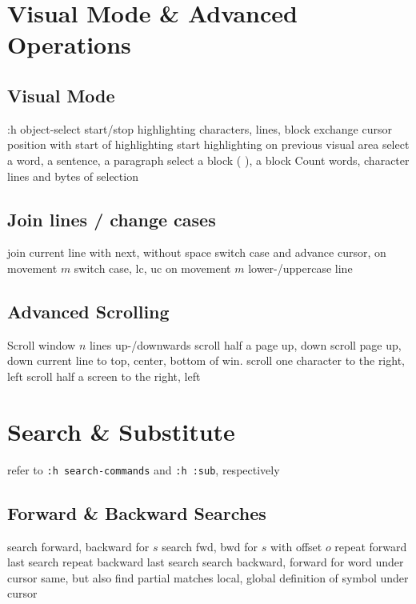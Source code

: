 \section{Visual Mode \& Advanced Operations}{}
\subsection{Visual Mode}	{:h object-select}
	{start/stop highlighting characters, lines, block}
	{exchange cursor position with start of highlighting}
	{start highlighting on previous visual area}
	{select a word, a sentence, a paragraph}
	{select a block ( ), a block {\tt\lapos}	{\tt\rapos}}
	{Count words, character lines and bytes of selection}

\subsection{Join lines / change cases}{}
	{join current line with next, without space}
	{switch case and advance cursor, on movement $m$ }
	{switch case, lc, uc on movement $m$}
	{lower-/uppercase line}

\subsection{Advanced Scrolling}	{}
	{Scroll window $n$ lines up-/downwards}
	{scroll half a page up, down}
	{scroll page up, down}
	{current line to top, center, bottom of win.}
	{scroll one character to the right, left}
	{scroll half a screen to the right, left}

\section{Search \& Substitute}	{refer to {\tt :h search-commands} and {\tt :h :sub}, respectively}
\subsection{Forward \& Backward Searches}	{}
	{search forward, backward for $s$}
	{search fwd, bwd for $s$ with offset $o$}
	{repeat forward last search}
	{repeat backward last search}
\cmdS{\# * }	{search backward, forward for word under cursor}
	{same, but also find partial matches}
	{local, global definition of symbol under cursor}

